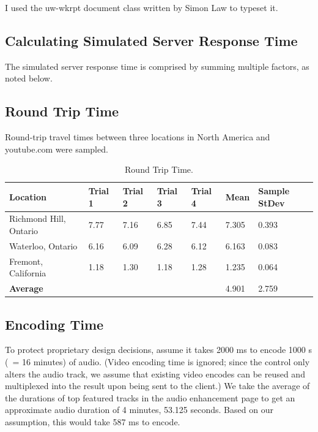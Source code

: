 \documentclass[se,resubmit]{uw-wkrpt}
\begin{document}
I used the \textsf{uw-wkrpt} document class written by Simon Law to 
typeset it.

\appendix
\begin{appendices}

\section{Calculating Simulated Server Response Time}\label{app:calculating}
The simulated server response time is comprised by summing multiple factors, as
noted below.

\subsection{Round Trip Time}
Round-trip travel times between three locations in North America and youtube.com
were sampled.

\begin{table}
  \caption{Round Trip Time.}
  \label{tbl:rtt}
  \centering
  \begin{tabular}{|p{2.0cm}|p{2.0cm}|p{2.0cm}|p{2.0cm}|p{2.0cm}|p{2.0cm}|
                   p{2.0cm}|}
    \hline
    \textbf{Location} &
    \textbf{Trial 1} &
    \textbf{Trial 2} &
    \textbf{Trial 3} &
    \textbf{Trial 4} &
    \textbf{Mean} &
    \textbf{Sample StDev} \\
    \hline
    \hline
    Richmond Hill, Ontario &
      7.77 & 7.16 & 6.85 & 7.44 & 7.305 & 0.393 \\
    \hline
    Waterloo, Ontario &
      6.16 & 6.09 & 6.28 & 6.12 & 6.163 & 0.083 \\
    \hline
    Fremont, California &
      1.18 & 1.30 & 1.18 & 1.28 & 1.235 & 0.064 \\
    \hline
    \hline
    \multicolumn{5}{|p{10.0cm}|}{\textbf{Average}} &
      4.901 & 2.759 \\
    \hline
  \end{tabular}
\end{table}

\subsection{Encoding Time}
To protect proprietary design decisions, assume it takes 2000 ms to encode 1000
s (~= 16 minutes) of audio. (Video encoding time is ignored; since the control
only alters the audio track, we assume that existing video encodes can be reused
and multiplexed into the result upon being sent to the client.) We take the
average of the durations of top featured tracks in the audio enhancement page to
get an approximate audio duration of 4 minutes, 53.125 seconds. Based on our
assumption, this would take 587 ms to encode.


\end{appendices}
\end{document}
